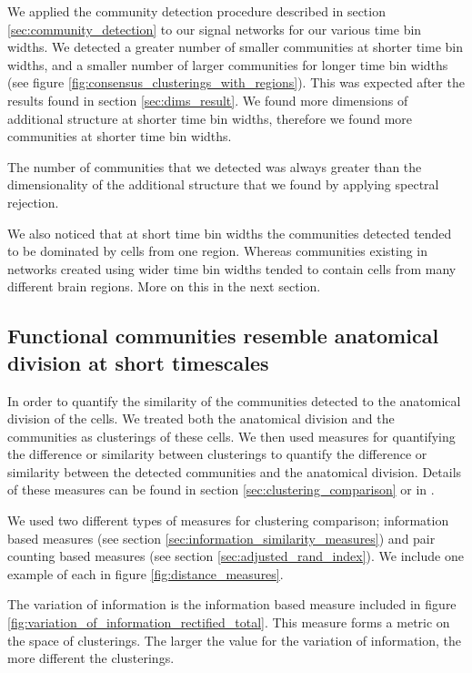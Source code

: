   We applied the community detection procedure described in section \ref{sec:community_detection} to our signal networks for our various time bin widths. We detected a greater number of smaller communities at shorter time bin widths, and a smaller number of larger communities for longer time bin widths (see figure \ref{fig:consensus_clusterings_with_regions}). This was expected after the results found in section \ref{sec:dims_result}. We found more dimensions of additional structure at shorter time bin widths, therefore we found more communities at shorter time bin widths.

  The number of communities that we detected was always greater than the dimensionality of the additional structure that we found by applying spectral rejection.

  We also noticed that at short time bin widths the communities detected tended to be dominated by cells from one region. Whereas communities existing in networks created using wider time bin widths tended to contain cells from many different brain regions. More on this in the next section.


  \subsection{Functional communities resemble anatomical division at short timescales}
  In order to quantify the similarity of the communities detected to the anatomical division of the cells. We treated both the anatomical division and the communities as clusterings of these cells. We then used measures for quantifying the difference or similarity between clusterings to quantify the difference or similarity between the detected communities and the anatomical division. Details of these measures can be found in section \ref{sec:clustering_comparison} or in  \parencite{vinh}.

  We used two different types of measures for clustering comparison; information based measures (see section \ref{sec:information_similarity_measures}) and pair counting based measures (see section \ref{sec:adjusted_rand_index}). We include one example of each in figure \ref{fig:distance_measures}.

  The variation of information is the information based measure included in figure \ref{fig:variation_of_information_rectified_total}. This measure forms a metric on the space of clusterings. The larger the value for the variation of information, the more different the clusterings.

